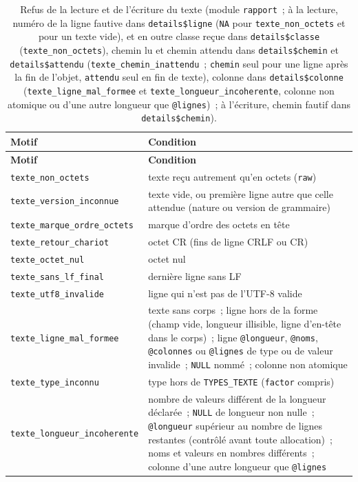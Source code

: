 \documentclass[a4paper,11pt]{article}
\newcommand{\code}[1]{\texttt{\small #1}}
\begin{document}
\begin{center}
\small
{}
\begin{longtable}{@{}p{5.4cm}p{9.4cm}@{}}
\caption{Refus de la lecture et de l'écriture du texte (module
\code{rapport}~; à la lecture, numéro de la ligne fautive dans
\code{details\$ligne} (\code{NA} pour \code{texte\_non\_octets} et pour un texte vide), et en outre
classe reçue dans \code{details\$classe} (\code{texte\_non\_octets}), chemin
lu et chemin attendu dans \code{details\$chemin} et \code{details\$attendu}
(\code{texte\_chemin\_inattendu}~; \code{chemin} seul pour une ligne après
la fin de l'objet, \code{attendu} seul en fin de texte), colonne dans
\code{details\$colonne} (\code{texte\_ligne\_mal\_formee} et
\code{texte\_longueur\_incoherente}, colonne non atomique ou d'une autre
longueur que \code{@lignes})~; à l'écriture, chemin fautif dans
\code{details\$chemin}).}
\label{tab:refus-texte}\\
\rowcolor{tableheader}
\textcolor{financeblue}{\textbf{Motif}} &
\textcolor{financeblue}{\textbf{Condition}} \\
\endfirsthead
\rowcolor{tableheader}
\textcolor{financeblue}{\textbf{Motif}} &
\textcolor{financeblue}{\textbf{Condition}} \\
\endhead
\code{texte\_non\_octets} & texte reçu autrement qu'en octets (\code{raw}) \\
\code{texte\_version\_inconnue} & texte vide, ou première ligne autre que celle attendue (nature ou version de grammaire) \\
\code{texte\_marque\_ordre\_octets} & marque d'ordre des octets en tête \\
\code{texte\_retour\_chariot} & octet CR (fins de ligne CRLF ou CR) \\
\code{texte\_octet\_nul} & octet nul \\
\code{texte\_sans\_lf\_final} & dernière ligne sans LF \\
\code{texte\_utf8\_invalide} & ligne qui n'est pas de l'UTF-8 valide \\
\code{texte\_ligne\_mal\_formee} & texte sans corps~; ligne hors de la forme (champ vide, longueur illisible, ligne d'en-tête dans le corps)~; ligne \code{@longueur}, \code{@noms}, \code{@colonnes} ou \code{@lignes} de type ou de valeur invalide~; \code{NULL} nommé~; colonne non atomique \\
\code{texte\_type\_inconnu} & type hors de \code{TYPES\_TEXTE} (\code{factor} compris) \\
\code{texte\_longueur\_incoherente} & nombre de valeurs différent de la longueur déclarée~; \code{NULL} de longueur non nulle~; \code{@longueur} supérieur au nombre de lignes restantes (contrôlé avant toute allocation)~; noms et valeurs en nombres différents~; colonne d'une autre longueur que \code{@lignes} \\

\end{longtable}
\end{center}
\end{document}

